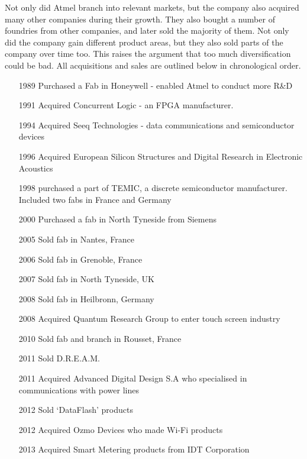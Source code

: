 Not only did Atmel branch into relevant markets, but the company also acquired many other companies during their growth. 
They also bought a number of foundries from other companies, and later sold the majority of them.
Not only did the company gain different product areas, but they also sold parts of the company over time too. 
This raises the argument that too much diversification could be bad.
All acquisitions and sales are outlined below in chronological order.%
\begin{enumerate}
\item[1989] Purchased a Fab in Honeywell - enabled Atmel to conduct more R\&D %
\item[1991] Acquired Concurrent Logic - an FPGA manufacturer. %
\item[1994] Acquired Seeq Technologies - data communications and semiconductor devices%
\item[1996] Acquired European Silicon Structures and Digital Research in Electronic Acoustics%
\item[1998] purchased a part of TEMIC, a discrete semiconductor manufacturer. Included two fabs in France and Germany %
\item[2000] Purchased a fab in North Tyneside from Siemens %
\item[2005] Sold fab in Nantes, France \cite{atmel:acq:nantes05}
\item[2006] Sold fab in Grenoble, France \cite{atmel:acq:grenoble06}
\item[2007] Sold fab in North Tyneside, UK\cite{atmel:acq:tyneside07}
\item[2008] Sold fab in Heilbronn, Germany\cite{atmel:acq:heilbronn08}
\item[2008] Acquired Quantum Research Group to enter touch screen industry\cite{atmel:acq:qrg08}
\item[2010] Sold fab and branch in Rousset, France\cite{atmel:acq:sms10}
\item[2011] Sold D.R.E.A.M. %
\item[2011] Acquired Advanced Digital Design S.A who specialised in communications with power lines \cite{atmel:acq:add11}
\item[2012] Sold `DataFlash' products \cite{atmel:acq:sflash12}
\item[2012] Acquired Ozmo Devices who made Wi-Fi products %
\item[2013] Acquired Smart Metering products from IDT Corporation \cite{atmel:acq:smartmeter13}
\end{enumerate}


